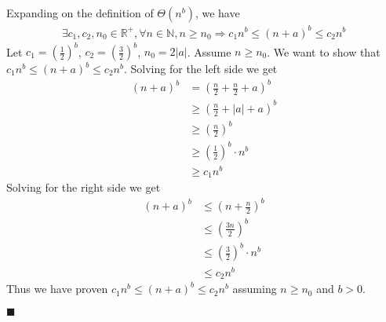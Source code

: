 \documentclass{article}
\newcommand\qedsymbol{\hfill$\blacksquare$}
\begin{document}
\begin{enumerate}[label = (\alph*)]
        Expanding on the definition of $\Theta (n^b)$, we have 
        \begin{align*}
            \exists c_1, c_2, n_0 \in \mathbb{R}^+, \forall n \in \mathbb{N}, 
            n \geq n_0 \Rightarrow
            c_1 n^b\leq (n + a)^b \leq c_2 n^b 
        \end{align*}
    Let $c_1 = (\frac{1}{2})^b$, $c_2 = (\frac{3}{2})^b$, $n_0 = 2 | a |$. Assume
    $n \geq n_0$. We want to show that $ c_1 n^b \leq (n + a)^b \leq c_2 n^b$.
    Solving for the left side we get 
    \begin{align*}
        (n+a)^b &= \left(\frac{n}{2} + \frac{n}{2} + a\right)^b  \\
                &\geq \left(\frac{n}{2} + |a| + a \right) ^b \tag*{(Since $n > 2|a|$)}\\
                &\geq \left( \frac{n}{2} \right)^b \tag*{(Since $|a| + a \geq 0$)} \\
                &\geq \left(\frac{1}{2}\right)^b \cdot n^b \\
                &\geq c_1 n^b
    \end{align*}
    Solving for the right side we get 
    \begin{align*}
        (n+a)^b &\leq \left(n + \frac{n}{2}\right)^b \tag*{(Since $ n \geq 2 |a|$)} \\
                &\leq \left(\frac{3n}{2}\right)^b \\
                &\leq \left(\frac{3}{2}\right)^b \cdot n^b \\
                &\leq c_2 n^b 
    \end{align*}
    Thus we have proven $c_1 n^b \leq (n + a)^b \leq c_2 n^b$ assuming 
    $n \geq n_0$ and $b > 0$. 

    \qedsymbol

\end{enumerate}
\end{document}
